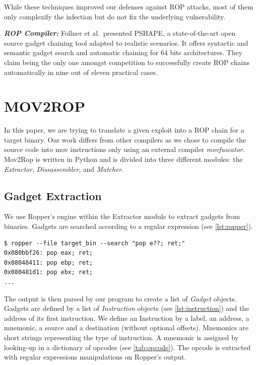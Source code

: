 \documentclass[10pt,twocolumn]{article}
\begin{document}
While these techniques improved our defenses against ROP attacks, most of them only
 complexify the infection but do not fix the underlying vulnerability.

\textbf{\textit{ROP Compiler:}} Follner et al.\ presented
PSHAPE\cite{barthe_pshape:_2016}, a state-of-the-art open source gadget
chaining tool adapted to realistic scenarios. It offers syntactic and semantic
gadget search and automatic chaining for 64 bits architectures.  They claim
being the only one amongst competition to successfully create ROP chains
automatically in nine out of eleven practical cases.


\section{MOV2ROP}

In this paper, we are trying to translate a given exploit into a ROP chain for
a target binary. Our work differs from other compilers as we chose to compile
the source code into mov instructions only using an external compiler
\textit{movfuscator}. Mov2Rop is written in Python and is divided into three
different modules: the \textit{Extractor}, \textit{Dissassembler}, and
\textit{Matcher}.

\subsection{Gadget Extraction}

We use Ropper's engine\cite{sashs_ropper} within the Extractor  module to
extract gadgets from binaries. Gadgets are searched according to a regular
expression (see \autoref{lst:ropper}).

\begin{lstlisting}[float=h,aboveskip=\medskipamount,belowskip=0pt,caption=Ropper
search engine,label=lst:ropper]
$ ropper --file target_bin --search "pop e??; ret;"
0x080bbf26: pop eax; ret;
0x08048411: pop ebp; ret;
0x080481d1: pop ebx; ret;
...
\end{lstlisting}

The output is then parsed by our program to create a list of \textit{Gadget}
objects. Gadgets are defined by a list of \textit{Instruction} objects (see
\autoref{lst:instruction}) and the
address of its first instruction. We define an Instruction by a label, an
address, a mnemonic, a source and a destination (without optional offsets).
Mnemonics are short strings representing the type of instruction. A mnemonic is
assigned by looking-up in a dictionary of opcodes (see \autoref{tab:opcode}). The opcode is extracted
with regular expressions manipulations on Ropper's output.
\end{document}
